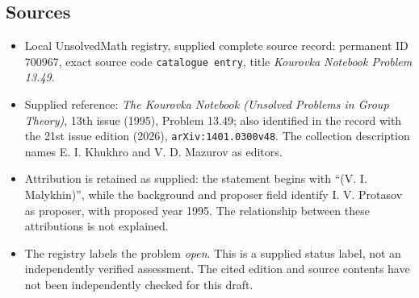 \documentclass[11pt]{article}
\begin{document}
\subsection{Sources}
\begin{itemize}
\item Local UnsolvedMath registry, supplied complete source record: permanent ID \(700967\), exact source code \texttt{catalogue entry}, title \emph{Kourovka Notebook Problem 13.49}.
\item Supplied reference: \emph{The Kourovka Notebook (Unsolved Problems in Group Theory)}, 13th issue (1995), Problem 13.49; also identified in the record with the 21st issue edition (2026), \texttt{arXiv:1401.0300v48}. The collection description names E. I. Khukhro and V. D. Mazurov as editors.
\item Attribution is retained as supplied: the statement begins with ``(V. I. Malykhin)'', while the background and proposer field identify I. V. Protasov as proposer, with proposed year 1995. The relationship between these attributions is not explained.
\item The registry labels the problem \emph{open}. This is a supplied status label, not an independently verified assessment. The cited edition and source contents have not been independently checked for this draft.
\end{itemize}
\end{document}
